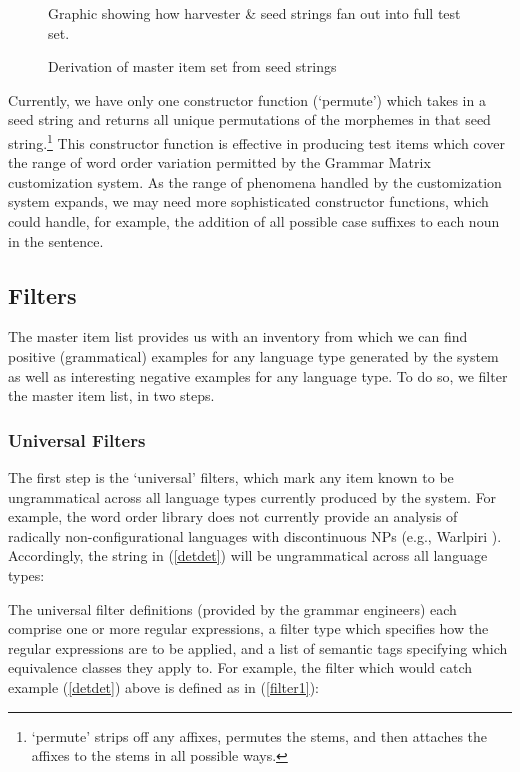 \documentclass[11pt]{article}
\begin{document}
\begin{figure}[ht]
\begin{center}

Graphic showing how harvester \& seed strings fan out into full test set.

\end{center}
\caption{Derivation of master item set from seed strings}
\label{h-to-full}
\end{figure}

Currently, we have only one constructor function (`permute') which
takes in a seed string and returns all unique permutations of the
morphemes in that seed string.\footnote{`permute' strips off any
affixes, permutes the stems, and then attaches the affixes to the
stems in all possible ways.}  This constructor function is effective
in producing test items which cover the range of word order variation
permitted by the Grammar Matrix customization system.  As the range of
phenomena handled by the customization system expands, we may need
more sophisticated constructor functions, which could handle, for
example, the addition of all possible case suffixes to each noun
in the sentence.

\subsection{Filters}

The master item list provides us with an inventory from which we
can find positive (grammatical) examples for any language type
generated by the system as well as interesting negative examples for
any language type.  To do so, we filter the master item list, in two
steps.  


\subsubsection{Universal Filters}

The first step is the `universal' filters, which mark any
item known to be ungrammatical across all language types currently
produced by the system.  For example, the word order library does
not currently provide an analysis of radically non-configurational
languages with discontinuous NPs (e.g., Warlpiri \cite{Hale81}).
Accordingly, the string in (\ref{detdet}) will be ungrammatical
across all language types:


The universal filter definitions (provided by the grammar engineers)
each comprise one or more regular expressions, a filter type which
specifies how the regular expressions are to be applied, and a list of
semantic tags specifying which equivalence classes they apply to.  For
example, the filter which would catch example (\ref{detdet}) above
is defined as in (\ref{filter1}):
\end{document}
